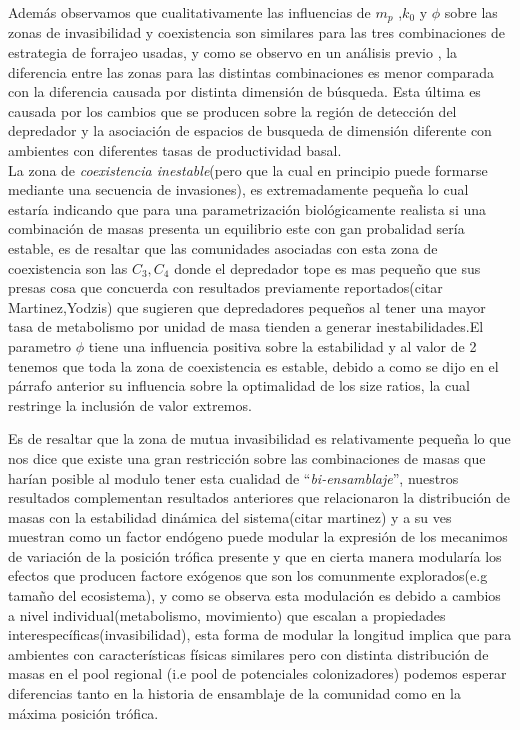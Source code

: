 Adem\'as observamos que cualitativamente las influencias de $m_p$ ,$k_0$ y $\phi$ sobre las zonas de invasibilidad y coexistencia son similares para las tres combinaciones de estrategia de forrajeo usadas, y como se observo en un an\'alisis previo\citep{pawar2012dimensionality} , la diferencia entre las zonas para las distintas combinaciones es menor comparada con la diferencia causada por distinta dimensi\'on de b\'usqueda. Esta \'ultima es causada por los cambios que se producen sobre la regi\'on de detecci\'on del depredador y la asociaci\'on de espacios de busqueda de dimensi\'on diferente con ambientes con diferentes tasas de productividad basal. \\


La zona de \emph{coexistencia inestable}(pero que la cual en principio puede formarse mediante una secuencia de invasiones), es extremadamente peque\~na lo cual estar\'ia indicando que para una parametrizaci\'on biol\'ogicamente realista si una combinaci\'on de masas presenta un equilibrio este con gan probalidad ser\'ia estable, es de resaltar que las comunidades asociadas con esta zona de coexistencia son las $C_3,C_4$ donde el depredador tope es mas peque\~no que sus presas cosa que concuerda con resultados previamente reportados(citar Martinez,Yodzis) que sugieren que depredadores peque\~nos al tener una mayor tasa de metabolismo por unidad de masa tienden a generar inestabilidades.El parametro $\phi$ tiene una influencia positiva sobre la estabilidad y al valor de 2 tenemos que toda la zona de coexistencia es estable, debido a como se dijo en el p\'arrafo anterior su influencia sobre la optimalidad de los size ratios, la cual restringe la inclusi\'on de valor extremos.


Es de resaltar que la zona de mutua invasibilidad es relativamente peque\~na lo que nos dice que existe una gran restricci\'on sobre las combinaciones de masas que har\'ian posible al modulo tener esta cualidad de ``\emph{bi-ensamblaje}'', nuestros resultados complementan resultados anteriores que relacionaron la distribuci\'on de masas con la estabilidad din\'amica del sistema(citar martinez) y a su ves muestran como un factor end\'ogeno puede modular la expresi\'on de los mecanimos de variaci\'on de la posici\'on tr\'ofica presente y que en cierta manera modular\'ia los efectos que producen factore ex\'ogenos que son los comunmente explorados(e.g tama\~no del ecosistema), y como se observa esta modulaci\'on es debido a cambios a nivel individual(metabolismo, movimiento) que escalan a propiedades interespec\'ificas(invasibilidad), esta forma de modular la longitud implica que para ambientes con caracter\'isticas f\'isicas similares pero con distinta distribuci\'on de masas en el pool regional (i.e pool de potenciales colonizadores) podemos esperar diferencias tanto en la historia de ensamblaje de la comunidad como en la m\'axima posici\'on tr\'ofica.

